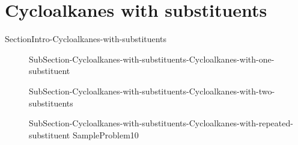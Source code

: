 \documentclass[main.tex]{subfiles}
\newcommand\chapterlabel{Ch-orgo}\setcounter{figurenewcounter}{0}\setcounter{tablenewcounter}{0}\setcounter{formulanewcounter}{0}
\begin{document}
\section{Cycloalkanes with substituents}{SectionIntro-Cycloalkanes-with-substituents}
\sloppy
\begin{description}
\item[]{SubSection-Cycloalkanes-with-substituents-Cycloalkanes-with-one-substituent}
\item[] {SubSection-Cycloalkanes-with-substituents-Cycloalkanes-with-two-substituents}
\item[]{SubSection-Cycloalkanes-with-substituents-Cycloalkanes-with-repeated-substituent}
{SampleProblem10}

\end{description}
\end{document}
